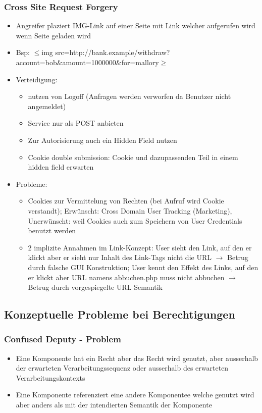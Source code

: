 \documentclass{article} %
\begin{document}
	\subsubsection{Cross Site Request Forgery}
	\begin{itemize}
		\item Angreifer plaziert IMG-Link auf einer Seite mit Link welcher aufgerufen wird wenn Seite geladen wird
		\item Bsp: $\le$img src=\glqq http://bank.example/withdraw?account=bob\&amount=1000000\&for=mallory\grqq$\ge$
		\item Verteidigung: 
		\begin{itemize}
			\item nutzen von Logoff (Anfragen werden verworfen da Benutzer nicht angemeldet)
			\item Service nur als POST anbieten
			\item Zur Autorisierung auch ein Hidden Field nutzen
			\item Cookie double submission: Cookie und dazupassenden Teil in einem hidden field erwarten
		\end{itemize}
		\item Probleme:
		\begin{itemize}
			\item Cookies zur Vermittelung von Rechten (bei Aufruf wird Cookie verstandt); Erwünscht: Cross Domain User Tracking (Marketing), Unerwünscht: weil Cookies auch zum Speichern von User Credentials benutzt werden
			\item 2 implizite Annahmen im Link-Konzept: User sieht den Link, auf den er klickt aber er sieht nur Inhalt des Link-Tags nicht die URL $\rightarrow$ Betrug durch falsche GUI Konstruktion; User kennt den Effekt des Links, auf den er klickt aber URL namens abbuchen.php muss nicht abbuchen $\rightarrow$ Betrug durch vorgespiegelte URL Semantik
		\end{itemize}
	\end{itemize}
	\subsection{Konzeptuelle Probleme bei Berechtigungen}
	\subsubsection{Confused Deputy - Problem}
	\begin{itemize}
		\item Eine Komponente hat ein Recht aber das Recht wird genutzt, aber ausserhalb der erwarteten Verarbeitungssequenz oder ausserhalb des erwarteten Verarbeitungskontexts
		\item Eine Komponente referenziert eine andere Komponentee welche genutzt wird aber anders als mit der intendierten Semantik der Komponente
	\end{itemize}
\end{document}
